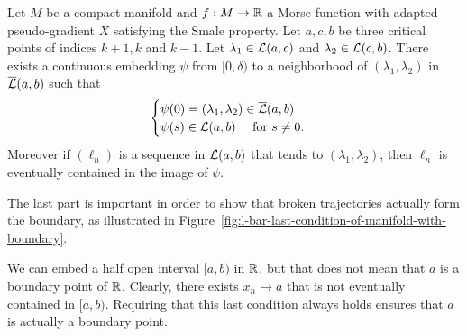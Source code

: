 \begin{prop}
    Let $M$ be a compact manifold and $f: M \to  \mathbb{R}$ a Morse function with adapted pseudo-gradient $X$ satisfying the Smale property. Let  $a,c,b$ be three critical points of indices  $k+1, k$ and $k-1$. Let $\lambda_1 \in \mathcal L(a, c)$ and $\lambda_2 \in \mathcal L(c, b)$.
    There exists a continuous embedding $\psi$ from $[0, \delta)$ to a neighborhood of $(\lambda_1, \lambda_2)$ in $\overline{\mathcal L}(a, b)$ such that
    \[
    \begin{cases}
        \psi(0) = (\lambda_1, \lambda_2) \in \overline{\mathcal L}(a, b)\\
        \psi(s) \in \mathcal L(a, b) \quad \text{ for } s \neq 0.
    \end{cases}
    \] 
    Moreover if $(\ell_n)$ is a sequence in $\mathcal L(a, b)$ that tends to $(\lambda_1, \lambda_2)$, then $ \ell_n$ is eventually contained in the image of $\psi$.
\end{prop}

The last part is important in order to show that broken trajectories actually form the boundary, as illustrated in Figure~\ref{fig:l-bar-last-condition-of-manifold-with-boundary}.
\begin{marginfigure}
    \centering
    \caption{We can embed a half open interval $[a, b)$ in $\mathbb{R}$, but that does not mean that $a$ is a boundary point of $\mathbb{R}$. Clearly, there exists $x_n \to a$ that is not eventually contained in $[a,b)$.
        Requiring that this last condition always holds ensures that $a$ is actually a boundary point.
    }
    \label{fig:l-bar-last-condition-of-manifold-with-boundary}
\end{marginfigure}

